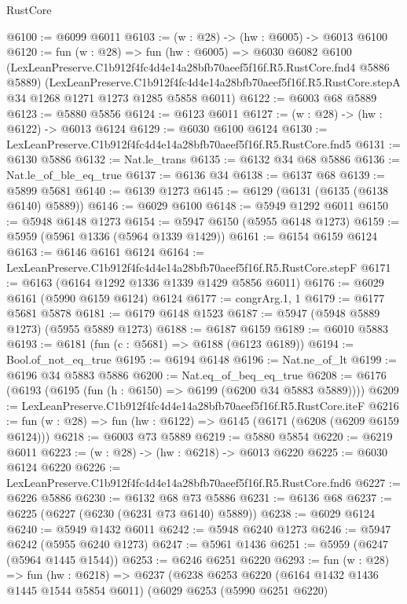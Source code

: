 \begin{lexlean}{RustCore}
\begin{coremodule}
@6100 := @6099 @6011
@6103 := (w : @28) -> (hw : @6005) -> @6013 @6100
@6120 := fun (w : @28) =>
  fun (hw : @6005) =>
  @6030
    @6082
    @6100
    (LexLeanPreserve.C1b912f4fc4d4e14a28bfb70aeef5f16f.R5.RustCore.fnd4 @5886 @5889)
    (LexLeanPreserve.C1b912f4fc4d4e14a28bfb70aeef5f16f.R5.RustCore.stepA
      @34
      @1268
      @1271
      @1273
      @1285
      @5858
      @6011)
@6122 := @6003 @68 @5889
@6123 := @5880 @5856
@6124 := @6123 @6011
@6127 := (w : @28) -> (hw : @6122) -> @6013 @6124
@6129 := @6030 @6100 @6124
@6130 := LexLeanPreserve.C1b912f4fc4d4e14a28bfb70aeef5f16f.R5.RustCore.fnd5
@6131 := @6130 @5886
@6132 := Nat.le_trans
@6135 := @6132 @34 @68 @5886
@6136 := Nat.le_of_ble_eq_true
@6137 := @6136 @34
@6138 := @6137 @68
@6139 := @5899 @5681
@6140 := @6139 @1273
@6145 := @6129 (@6131 (@6135 (@6138 @6140) @5889))
@6146 := @6029 @6100
@6148 := @5949 @1292 @6011
@6150 := @5948 @6148 @1273
@6154 := @5947 @6150 (@5955 @6148 @1273)
@6159 := @5959 (@5961 @1336 (@5964 @1339 @1429))
@6161 := @6154 @6159 @6124
@6163 := @6146 @6161 @6124
@6164 := LexLeanPreserve.C1b912f4fc4d4e14a28bfb70aeef5f16f.R5.RustCore.stepF
@6171 := @6163 (@6164 @1292 @1336 @1339 @1429 @5856 @6011)
@6176 := @6029 @6161 (@5990 @6159 @6124) @6124
@6177 := congrArg.{1, 1}
@6179 := @6177 @5681 @5878
@6181 := @6179 @6148 @1523
@6187 := @5947 (@5948 @5889 @1273) (@5955 @5889 @1273)
@6188 := @6187 @6159
@6189 := @6010 @5883
@6193 := @6181 (fun (c : @5681) => @6188 (@6123 @6189))
@6194 := Bool.of_not_eq_true
@6195 := @6194 @6148
@6196 := Nat.ne_of_lt
@6199 := @6196 @34 @5883 @5886
@6200 := Nat.eq_of_beq_eq_true
@6208 := @6176 (@6193 (@6195 (fun (h : @6150) => @6199 (@6200 @34 @5883 @5889))))
@6209 := LexLeanPreserve.C1b912f4fc4d4e14a28bfb70aeef5f16f.R5.RustCore.iteF
@6216 := fun (w : @28) => fun (hw : @6122) => @6145 (@6171 (@6208 (@6209 @6159 @6124)))
@6218 := @6003 @73 @5889
@6219 := @5880 @5854
@6220 := @6219 @6011
@6223 := (w : @28) -> (hw : @6218) -> @6013 @6220
@6225 := @6030 @6124 @6220
@6226 := LexLeanPreserve.C1b912f4fc4d4e14a28bfb70aeef5f16f.R5.RustCore.fnd6
@6227 := @6226 @5886
@6230 := @6132 @68 @73 @5886
@6231 := @6136 @68
@6237 := @6225 (@6227 (@6230 (@6231 @73 @6140) @5889))
@6238 := @6029 @6124
@6240 := @5949 @1432 @6011
@6242 := @5948 @6240 @1273
@6246 := @5947 @6242 (@5955 @6240 @1273)
@6247 := @5961 @1436
@6251 := @5959 (@6247 (@5964 @1445 @1544))
@6253 := @6246 @6251 @6220
@6293 := fun (w : @28) =>
  fun (hw : @6218) =>
  @6237
    (@6238
      @6253
      @6220
      (@6164 @1432 @1436 @1445 @1544 @5854 @6011)
      (@6029
        @6253
        (@5990 @6251 @6220)

\end{coremodule}
\end{lexlean}
